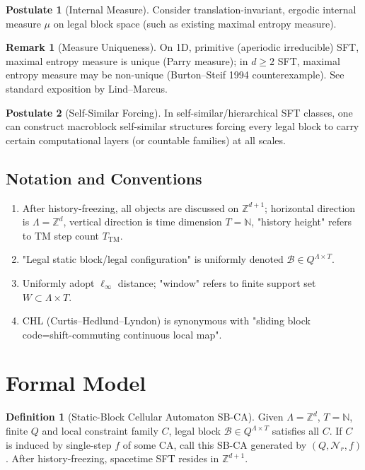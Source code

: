 \documentclass[12pt]{article}
\theoremstyle{plain}
\theoremstyle{definition}
\newtheorem{definition}[theorem]{Definition}
\newtheorem{remark}[theorem]{Remark}
\newtheorem{postulate}{Postulate}
\begin{document}
\begin{postulate}[Internal Measure]
Consider translation-invariant, ergodic internal measure $\mu$ on legal block space (such as existing maximal entropy measure).
\end{postulate}

\begin{remark}[Measure Uniqueness]
On 1D, primitive (aperiodic irreducible) SFT, maximal entropy measure is unique (Parry measure); in $d \ge 2$ SFT, maximal entropy measure may be non-unique (Burton--Steif 1994 counterexample\cite{burton1994}). See standard exposition by Lind--Marcus\cite{lind1995}.
\end{remark}

\begin{postulate}[Self-Similar Forcing]
In self-similar/hierarchical SFT classes, one can construct macroblock self-similar structures forcing every legal block to carry certain computational layers (or countable families) at all scales.
\end{postulate}

\subsection{Notation and Conventions}

\begin{enumerate}
\item After history-freezing, all objects are discussed on $\mathbb{Z}^{d+1}$; horizontal direction is $\Lambda=\mathbb{Z}^d$, vertical direction is time dimension $T=\mathbb{N}$, "history height" refers to TM step count $T_{\mathrm{TM}}$.
\item "Legal static block/legal configuration" is uniformly denoted $\mathcal{B}\in Q^{\Lambda\times T}$.
\item Uniformly adopt $\ell_\infty$ distance; "window" refers to finite support set $W\subset \Lambda\times T$.
\item CHL (Curtis--Hedlund--Lyndon) is synonymous with "sliding block code=shift-commuting continuous local map".
\end{enumerate}

\section{Formal Model}

\begin{definition}[Static-Block Cellular Automaton SB-CA]
Given $\Lambda = \mathbb{Z}^d$, $T = \mathbb{N}$, finite $Q$ and local constraint family $C$, legal block $\mathcal{B} \in Q^{\Lambda \times T}$ satisfies all $C$. If $C$ is induced by single-step $f$ of some CA, call this SB-CA generated by $(Q, \mathcal{N}_r, f)$. After history-freezing, spacetime SFT resides in $\mathbb{Z}^{d+1}$.
\end{definition}
\end{document}
